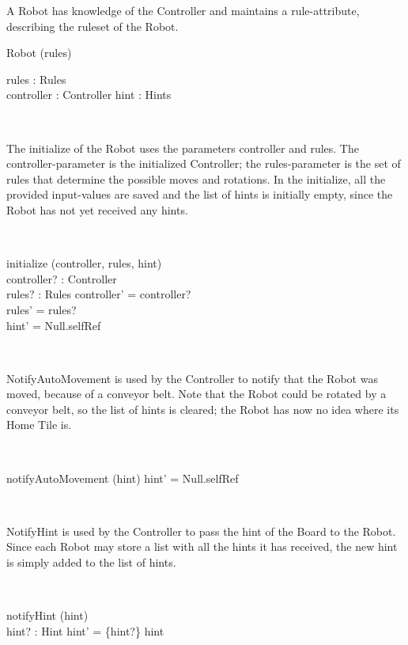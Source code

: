 A Robot has knowledge of the Controller and maintains a rule-attribute, describing the ruleset of the Robot.
\begin{class}{Robot}
\upharpoonright (rules) \\
\begin{state}
rules : Rules \\
controller : Controller
hint : Hints
\end{state}\\
\begin{classcom}
The initialize of the Robot uses the parameters controller and rules. The controller-parameter is the initialized Controller; the rules-parameter is the set of rules that determine the possible moves and rotations. In the initialize, all the provided input-values are saved and the list of hints is initially empty, since the Robot has not yet received any hints.
\end{classcom} \\
\begin{schema}{initialize}
\Delta (controller, rules, hint) \\
controller? : Controller \\
rules? : Rules
\where
controller' = controller? \\
rules' = rules? \\
hint' = Null.selfRef
\end{schema}\\
\begin{classcom}
NotifyAutoMovement is used by the Controller to notify that the Robot was moved, because of a conveyor belt. Note that the Robot could be rotated by a conveyor belt, so the list of hints is cleared; the Robot has now no idea where its Home Tile is.
\end{classcom} \\
\begin{schema}{notifyAutoMovement}
\Delta (hint)
\where
hint' = Null.selfRef
\end{schema}\\
\begin{classcom}
NotifyHint is used by the Controller to pass the hint of the Board to the Robot. Since each Robot may store a list with all the hints it has received, the new hint is simply added to the list of hints.
\end{classcom} \\
\begin{schema}{notifyHint}
\Delta (hint) \\
hint? : Hint
\where
hint' = \{hint?\} \union hint
\end{schema}
\end{class}


